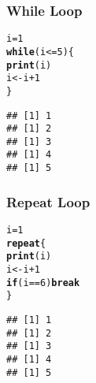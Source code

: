 \documentclass[../../dsa1101_notes.Rtex]{subfiles}\usepackage[]{graphicx}\usepackage[]{color}
\makeatletter
\newcommand{\hlnum}[1]{\textcolor[rgb]{0.686,0.059,0.569}{#1}}%
\newcommand{\hlopt}[1]{\textcolor[rgb]{0,0,0}{#1}}%
\newcommand{\hlstd}[1]{\textcolor[rgb]{0.345,0.345,0.345}{#1}}%
\newcommand{\hlkwa}[1]{\textcolor[rgb]{0.161,0.373,0.58}{\textbf{#1}}}%
\newcommand{\hlkwb}[1]{\textcolor[rgb]{0.69,0.353,0.396}{#1}}%
\newcommand{\hlkwd}[1]{\textcolor[rgb]{0.737,0.353,0.396}{\textbf{#1}}}%
\newenvironment{kframe}{%
 \def\at@end@of@kframe{}%
 \ifinner\ifhmode%
  \def\at@end@of@kframe{\end{minipage}}%
  \begin{minipage}{\columnwidth}%
 \fi\fi%
 \def\FrameCommand##1{\hskip\@totalleftmargin \hskip-\fboxsep
 \colorbox{shadecolor}{##1}\hskip-\fboxsep
     \hskip-\linewidth \hskip-\@totalleftmargin \hskip\columnwidth}%
 \MakeFramed {\advance\hsize-\width
   \@totalleftmargin\z@ \linewidth\hsize
   \@setminipage}}%
 {\par\unskip\endMakeFramed%
 \at@end@of@kframe}
\newenvironment{knitrout}{}{} %
\makeatother
\begin{document}
  \subsubsection{While Loop}
\begin{knitrout}
\color{fgcolor}\begin{kframe}
\begin{alltt}
  \hlstd{i} \hlkwb{=} \hlnum{1}
\hlkwa{while} \hlstd{(i} \hlopt{<=} \hlnum{5}\hlstd{) \{}
  \hlkwd{print}\hlstd{(i)}
  \hlstd{i} \hlkwb{<-} \hlstd{i} \hlopt{+} \hlnum{1}
\hlstd{\}}
\end{alltt}
\begin{verbatim}
## [1] 1
## [1] 2
## [1] 3
## [1] 4
## [1] 5
\end{verbatim}
\end{kframe}
\end{knitrout}
  
  \subsubsection{Repeat Loop}
\begin{knitrout}
\color{fgcolor}\begin{kframe}
\begin{alltt}
  \hlstd{i} \hlkwb{=} \hlnum{1}
\hlkwa{repeat} \hlstd{\{}
  \hlkwd{print}\hlstd{(i)}
  \hlstd{i} \hlkwb{<-} \hlstd{i} \hlopt{+} \hlnum{1}
  \hlkwa{if} \hlstd{(i} \hlopt{==} \hlnum{6}\hlstd{)} \hlkwa{break}
\hlstd{\}}
\end{alltt}
\begin{verbatim}
## [1] 1
## [1] 2
## [1] 3
## [1] 4
## [1] 5
\end{verbatim}
\end{kframe}
\end{knitrout}
\end{document}
